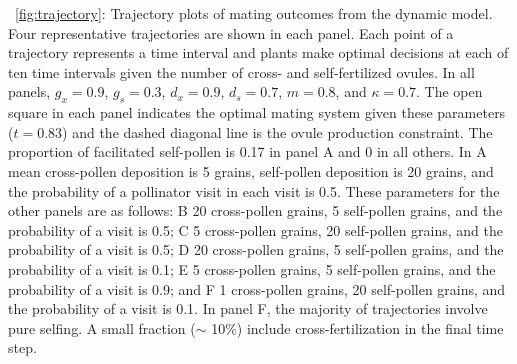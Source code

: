 \documentclass[letterpaper,titlepage]{scrartcl}
\begin{document}
{\fref}~\ref{fig:trajectory}: Trajectory plots of mating outcomes from
the dynamic model. Four representative trajectories are shown in each
panel. Each point of a trajectory represents a time interval and
plants make optimal decisions at each of ten time intervals given the
number of cross- and self-fertilized ovules. In all panels,
$g_{x}=0.9$, $g_{s}=0.3$, $d_{x}=0.9$, $d_{s}=0.7$, $m=0.8$, and
$\kappa =0.7$. The open square in each panel indicates the optimal
mating system given these parameters ($t=0.83$) and the dashed
diagonal line is the ovule production constraint. The proportion of
facilitated self-pollen is 0.17 in panel A and 0 in all others. In A
mean cross-pollen deposition is 5 grains, self-pollen deposition is 20
grains, and the probability of a pollinator visit in each visit is
0.5. These parameters for the other panels are as follows: B 20
cross-pollen grains, 5 self-pollen grains, and the probability of a
visit is 0.5; C 5 cross-pollen grains, 20 self-pollen grains, and the
probability of a visit is 0.5; D 20 cross-pollen grains, 5 self-pollen
grains, and the probability of a visit is 0.1; E 5 cross-pollen
grains, 5 self-pollen grains, and the probability of a visit is 0.9;
and F 1 cross-pollen grains, 20 self-pollen grains, and the
probability of a visit is 0.1. In panel F, the majority of
trajectories involve pure selfing. A small fraction ($\sim$ 10\%)
include cross-fertilization in the final time step.

\newpage
\end{document}
